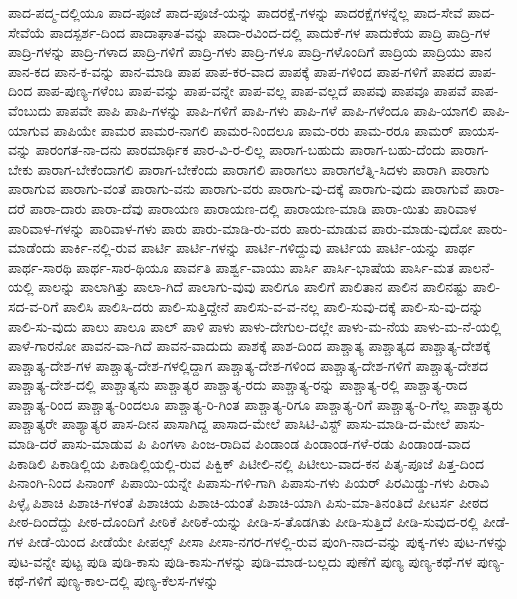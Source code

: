 {ಪಾದ-ಪದ್ಮ-ದಲ್ಲಿಯೂ
ಪಾದ-ಪೂಜೆ
ಪಾದ-ಪೂಜೆ-ಯನ್ನು
ಪಾದರಕ್ಷೆ-ಗಳನ್ನು
ಪಾದರಕ್ಷೆಗಳನ್ನೆಲ್ಲ
ಪಾದ-ಸೇವೆ
ಪಾದ-ಸೇವೆಯೆ
ಪಾದಸ್ಪರ್ಶ-ದಿಂದ
ಪಾದಾಘಾತ-ವನ್ನು
ಪಾದಾ-ರವಿಂದ-ದಲ್ಲಿ
ಪಾದುಕೆ-ಗಳ
ಪಾದುಕೆಯ
ಪಾದ್ರಿ
ಪಾದ್ರಿ-ಗಳ
ಪಾದ್ರಿ-ಗಳನ್ನು
ಪಾದ್ರಿ-ಗಳಾದ
ಪಾದ್ರಿ-ಗಳಿಗೆ
ಪಾದ್ರಿ-ಗಳು
ಪಾದ್ರಿ-ಗಳೂ
ಪಾದ್ರಿ-ಗಳೊಂದಿಗೆ
ಪಾದ್ರಿಯ
ಪಾದ್ರಿಯು
ಪಾನ
ಪಾನ-ಕದ
ಪಾನ-ಕ-ವನ್ನು
ಪಾನ-ಮಾಡಿ
ಪಾಪ
ಪಾಪ-ಕರ-ವಾದ
ಪಾಪಕ್ಕೆ
ಪಾಪ-ಗಳಿಂದ
ಪಾಪ-ಗಳಿಗೆ
ಪಾಪದ
ಪಾಪ-ದಿಂದ
ಪಾಪ-ಪುಣ್ಯ-ಗಳೆಂಬ
ಪಾಪ-ವನ್ನು
ಪಾಪ-ವನ್ನೇ
ಪಾಪ-ವಲ್ಲ
ಪಾಪ-ವಲ್ಲದೆ
ಪಾಪವು
ಪಾಪವೂ
ಪಾಪವೆ
ಪಾಪ-ವೆಂಬುದು
ಪಾಪವೇ
ಪಾಪಿ
ಪಾಪಿ-ಗಳನ್ನು
ಪಾಪಿ-ಗಳಿಗೆ
ಪಾಪಿ-ಗಳು
ಪಾಪಿ-ಗಳೆ
ಪಾಪಿ-ಗಳೆಂದೂ
ಪಾಪಿ-ಯಾಗಲಿ
ಪಾಪಿ-ಯಾಗುವ
ಪಾಪಿಯೇ
ಪಾಮರ
ಪಾಮರ-ನಾಗಲಿ
ಪಾಮರ-ನಿಂದಲೂ
ಪಾಮ-ರರು
ಪಾಮ-ರರೂ
ಪಾಮರ್
ಪಾಯಸ-ವನ್ನು
ಪಾರಂಗತ-ನಾ-ದನು
ಪಾರಮಾರ್ಥಿಕ
ಪಾರ-ವಿ-ರ-ಲಿಲ್ಲ
ಪಾರಾಗ-ಬಹುದು
ಪಾರಾಗ-ಬಹು-ದೆಂದು
ಪಾರಾಗ-ಬೇಕು
ಪಾರಾಗ-ಬೇಕೆಂದಾಗಲಿ
ಪಾರಾಗ-ಬೇಕೆಂದು
ಪಾರಾಗಲಿ
ಪಾರಾಗಲು
ಪಾರಾಗಲೆತ್ನಿ-ಸಿದಳು
ಪಾರಾಗಿ
ಪಾರಾಗು
ಪಾರಾಗುವ
ಪಾರಾಗು-ವಂತೆ
ಪಾರಾಗು-ವನು
ಪಾರಾಗು-ವರು
ಪಾರಾಗು-ವು-ದಕ್ಕೆ
ಪಾರಾಗು-ವುದು
ಪಾರಾಗುವೆ
ಪಾರಾ-ದರೆ
ಪಾರಾ-ದಾರು
ಪಾರಾ-ದೆವು
ಪಾರಾಯಣ
ಪಾರಾಯಣ-ದಲ್ಲಿ
ಪಾರಾಯಣ-ಮಾಡಿ
ಪಾರಾ-ಯಿತು
ಪಾರಿವಾಳ
ಪಾರಿವಾಳ-ಗಳನ್ನು
ಪಾರಿವಾಳ-ಗಳು
ಪಾರು
ಪಾರು-ಮಾಡಿ-ರು-ವರು
ಪಾರು-ಮಾಡುವ
ಪಾರು-ಮಾಡು-ವುದೋ
ಪಾರು-ಮಾಡೆಂದು
ಪಾರ್ಕಿ-ನಲ್ಲಿ-ರುವ
ಪಾರ್ಟಿ
ಪಾರ್ಟಿ-ಗಳನ್ನು
ಪಾರ್ಟಿ-ಗಳಿದ್ದುವು
ಪಾರ್ಟಿಯ
ಪಾರ್ಟಿ-ಯನ್ನು
ಪಾರ್ಥ
ಪಾರ್ಥ-ಸಾರಥಿ
ಪಾರ್ಥ-ಸಾರ-ಥಿಯೂ
ಪಾರ್ವತಿ
ಪಾರ್ಶ್ವ-ವಾಯು
ಪಾರ್ಸಿ
ಪಾರ್ಸಿ-ಭಾಷೆಯ
ಪಾರ್ಸಿ-ಮತ
ಪಾಲನೆ-ಯಲ್ಲಿ
ಪಾಲನ್ನು
ಪಾಲಾಗಿತ್ತು
ಪಾಲಾ-ಗಿದೆ
ಪಾಲಾಗು-ವುವು
ಪಾಲಿಗೂ
ಪಾಲಿಗೆ
ಪಾಲಿತಾನ
ಪಾಲಿನ
ಪಾಲಿನಷ್ಟು
ಪಾಲಿ-ಸದ-ವ-ರಿಗೆ
ಪಾಲಿಸಿ
ಪಾಲಿಸಿ-ದರು
ಪಾಲಿ-ಸುತ್ತಿದ್ದೇನೆ
ಪಾಲಿಸು-ವ-ವ-ನಲ್ಲ
ಪಾಲಿ-ಸುವು-ದಕ್ಕೆ
ಪಾಲಿ-ಸು-ವು-ದನ್ನು
ಪಾಲಿ-ಸು-ವುದು
ಪಾಲು
ಪಾಲೂ
ಪಾಲ್
ಪಾಳಿ
ಪಾಳು
ಪಾಳು-ದೇಗುಲ-ದಲ್ಲೇ
ಪಾಳು-ಮ-ನೆಯ
ಪಾಳು-ಮ-ನೆ-ಯಲ್ಲಿ
ಪಾಳೆ-ಗಾರನೋ
ಪಾವನ-ವಾ-ಗಿದೆ
ಪಾವನ-ವಾದುದು
ಪಾಶಕ್ಕೆ
ಪಾಶ-ದಿಂದ
ಪಾಶ್ಚಾತ್ಯ
ಪಾಶ್ಚಾತ್ಯದ
ಪಾಶ್ಚಾತ್ಯ-ದೇಶಕ್ಕೆ
ಪಾಶ್ಚಾತ್ಯ-ದೇಶ-ಗಳ
ಪಾಶ್ಚಾತ್ಯ-ದೇಶ-ಗಳಲ್ಲಿದ್ದಾಗ
ಪಾಶ್ಚಾತ್ಯ-ದೇಶ-ಗಳಿಂದ
ಪಾಶ್ಚಾತ್ಯ-ದೇಶ-ಗಳಿಗೆ
ಪಾಶ್ಚಾತ್ಯ-ದೇಶದ
ಪಾಶ್ಚಾತ್ಯ-ದೇಶ-ದಲ್ಲಿ
ಪಾಶ್ಚಾತ್ಯನು
ಪಾಶ್ಚಾತ್ಯರ
ಪಾಶ್ಚಾತ್ಯ-ರದು
ಪಾಶ್ಚಾತ್ಯ-ರನ್ನು
ಪಾಶ್ಚಾತ್ಯ-ರಲ್ಲಿ
ಪಾಶ್ಚಾತ್ಯ-ರಾದ
ಪಾಶ್ಚಾತ್ಯ-ರಿಂದ
ಪಾಶ್ಚಾತ್ಯ-ರಿಂದಲೂ
ಪಾಶ್ಚಾತ್ಯ-ರಿ-ಗಿಂತ
ಪಾಶ್ಚಾತ್ಯ-ರಿಗೂ
ಪಾಶ್ಚಾತ್ಯ-ರಿಗೆ
ಪಾಶ್ಚಾತ್ಯ-ರಿ-ಗೆಲ್ಲ
ಪಾಶ್ಚಾತ್ಯರು
ಪಾಶ್ಚಾತ್ಯರೇ
ಪಾಶ್ಯಾತ್ಯರ
ಪಾಸ-ದೀನ
ಪಾಸಾಗಿದ್ದ
ಪಾಸಾದ-ಮೇಲೆ
ಪಾಸಿಟಿ-ವಿಸ್ಟ್
ಪಾಸು-ಮಾಡಿ-ದ-ಮೇಲೆ
ಪಾಸು-ಮಾಡಿ-ದರೆ
ಪಾಸು-ಮಾಡುವ
ಪಿ
ಪಿಂಗಳಾ
ಪಿಂಜ-ರಾದಿವ
ಪಿಂಡಾಂಡ
ಪಿಂಡಾಂಡ-ಗಳೆ-ರಡು
ಪಿಂಡಾಂಡ-ವಾದ
ಪಿಕಾಡಿಲಿ
ಪಿಕಾಡಿಲ್ಲಿಯ
ಪಿಕಾಡಿಲ್ಲಿಯಲ್ಲಿ-ರುವ
ಪಿಕ್ವಿಕ್
ಪಿಟೀಲಿ-ನಲ್ಲಿ
ಪಿಟೀಲು-ವಾದ-ಕನ
ಪಿತೃ-ಪೂಜೆ
ಪಿತ್ತ-ದಿಂದ
ಪಿನಾಂಗಿ-ನಿಂದ
ಪಿನಾಂಗ್
ಪಿಪಾಯಿ-ಯನ್ನೇ
ಪಿಪಾಸು-ಗಳಿ-ಗಾಗಿ
ಪಿಪಾಸು-ಗಳು
ಪಿಯರ್
ಪಿರಮಿಡ್ಡು-ಗಳು
ಪಿರಾವಿ
ಪಿಳ್ಳೈ
ಪಿಶಾಚಿ
ಪಿಶಾಚಿ-ಗಳಂತೆ
ಪಿಶಾಚಿಯ
ಪಿಶಾಚಿ-ಯಂತೆ
ಪಿಶಾಚಿ-ಯಾಗಿ
ಪಿಸು-ಮಾ-ತಿನಂತಿದೆ
ಪೀಟರ್ಸ
ಪೀಠದ
ಪೀಠ-ದಿಂದೆದ್ದು
ಪೀಠ-ದೊಂದಿಗೆ
ಪೀಠಿಕೆ
ಪೀಠಿಕೆ-ಯನ್ನು
ಪೀಡಿ-ಸ-ತೊಡಗಿತು
ಪೀಡಿ-ಸುತ್ತಿದೆ
ಪೀಡಿ-ಸುವುದ-ರಲ್ಲಿ
ಪೀಡೆ-ಗಳ
ಪೀಡೆ-ಯಿಂದ
ಪೀಡೆಯೇ
ಪೀಪಲ್ಸ್
ಪೀಸಾ
ಪೀಸಾ-ನಗರ-ಗಳಲ್ಲಿ-ರುವ
ಪುಂಗಿ-ನಾದ-ವನ್ನು
ಪುಕ್ಕ-ಗಳು
ಪುಟ-ಗಳನ್ನು
ಪುಟ-ವನ್ನೇ
ಪುಟ್ಟ
ಪುಡಿ
ಪುಡಿ-ಕಾಸು
ಪುಡಿ-ಕಾಸು-ಗಳನ್ನು
ಪುಡಿ-ಮಾಡ-ಬಲ್ಲದು
ಪುಣೆಗೆ
ಪುಣ್ಯ
ಪುಣ್ಯ-ಕಥೆ-ಗಳ
ಪುಣ್ಯ-ಕಥೆ-ಗಳಿಗೆ
ಪುಣ್ಯ-ಕಾಲ-ದಲ್ಲಿ
ಪುಣ್ಯ-ಕೆಲಸ-ಗಳನ್ನು
}
